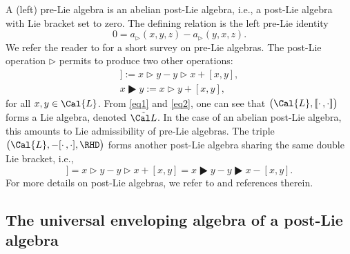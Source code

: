 \documentclass[10pt,a4paper]{amsart}
\numberwithin{equation}{section}
\begin{document}
A (left) pre-Lie algebra is an abelian post-Lie algebra, i.e., a post-Lie algebra with Lie bracket set to zero. The defining relation is the left pre-Lie identity
\begin{equation}
\label{left-pl}
0=a_\rhd(x,y,z)-a_\rhd(y,x,z).
\end{equation}
We refer the reader to \cite{AL2011} for a short survey on pre-Lie algebras. The post-Lie operation $\rhd$ permits to produce two other operations:
\begin{gather*}
[\![x, y]\!] := x \rhd y - y \rhd x + [x, y],
\\
x \RHD y := x \rhd y + [x, y],
\end{gather*}
for all $x, y \in \Cal{L}$. From \eqref{eq1} and \eqref{eq2}, one can see that $\big(\Cal{L}, [\![\cdot\,,\cdot ]\!]\big)$ forms a Lie algebra, denoted $\tilde{\Cal L}$. In the case of an abelian post-Lie algebra, this amounts to Lie admissibility of pre-Lie algebras. The triple $\big(\Cal{L}, - [\cdot\,,\cdot ], \RHD\big)$ forms another post-Lie algebra \cite{CEO20, HA13} sharing the same double Lie bracket, i.e.,
\begin{displaymath}
[\![x, y]\!]
= x \rhd y - y \rhd x + [x, y]
=x \RHD y - y \RHD x - [x, y].
\end{displaymath}
For more details on post-Lie algebras, we refer to \cite{CEMK18,ELM2015,EI2018,HA13} and references therein.

\subsection{The universal enveloping algebra of a post-Lie algebra}
\end{document}
